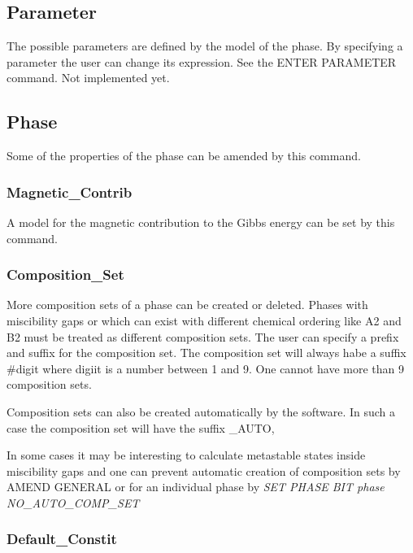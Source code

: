 \documentclass[12pt]{article}
\begin{document}
\subsection{Parameter}

The possible parameters are defined by the model of the phase.  By
specifying a parameter the user can change its expression.  See the
ENTER PARAMETER command.  Not implemented yet.

\subsection{Phase}

Some of the properties of the phase can be amended by this command.

\subsubsection{Magnetic\_Contrib}

A model for the magnetic contribution to the Gibbs energy can be set
by this command.

\subsubsection{Composition\_Set}

More composition sets of a phase can be created or deleted.  Phases
with miscibility gaps or which can exist with different chemical
ordering like A2 and B2 must be treated as different composition sets.
The user can specify a prefix and suffix for the composition set.  The
composition set will always habe a suffix \#digit where digiit is a
number between 1 and 9.  One cannot have more than 9 composition sets.

Composition sets can also be created automatically by the software.  In
such a case the composition set will have the suffix \_AUTO,

In some cases it may be interesting to calculate metastable states inside
miscibility gaps and one can prevent automatic creation of composition
sets by {\rm AMEND GENERAL} or for an individual phase by {\em SET
PHASE BIT {\em phase} NO\_AUTO\_COMP\_SET}

\subsubsection{Default\_Constit}
\end{document}
